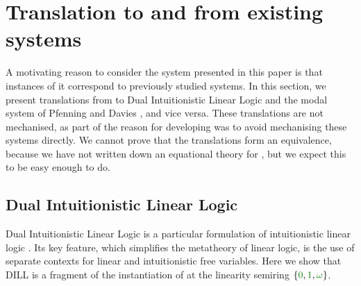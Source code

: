\documentclass[submission,copyright,creativecommons]{eptcs}
\begin{document}
\section{Translation to and from existing systems}
\label{sec:translation}

A motivating reason to consider the system presented in this paper is that
instances of it correspond to previously studied systems.
In this section, we present translations from \name{} to Dual Intuitionistic
Linear Logic \cite{Barber1996} and the modal system of Pfenning and Davies
\cite{judgmental}, and vice versa.
These translations are not mechanised, as part of the reason for developing
\name{} was to avoid mechanising these systems directly.
We cannot prove that the translations form an equivalence, because we have not
written down an equational theory for \name{}, but we expect this to be easy
enough to do.

\subsection{Dual Intuitionistic Linear Logic}\label{sec:dill}
Dual Intuitionistic Linear Logic is a particular formulation of intuitionistic
linear logic \cite{Barber1996}.
Its key feature, which simplifies the metatheory of linear logic, is the use of
separate contexts for linear and intuitionistic free variables.
Here we show that DILL is a fragment of the instantiation of \name{} at the
linearity semiring $\{\zero, \linear, \unrestricted\}$.
\end{document}
